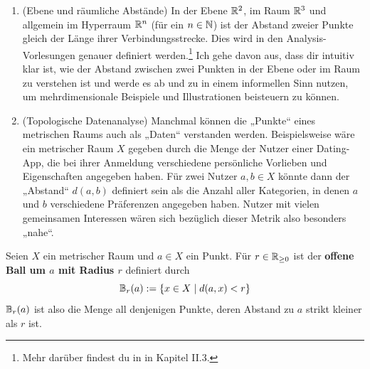 \begin{bsp} \quad
    \begin{enumerate}
        \item(Ebene und räumliche Abstände) In der Ebene $\mathbb R^2$, im Raum $\mathbb R^3$ und allgemein im Hyperraum $\mathbb R^n$ (für ein $n\in \mathbb N$) ist der Abstand zweier Punkte gleich der Länge ihrer Verbindungsstrecke. Dies wird in den Analysis-Vorlesungen genauer definiert werden.\footnote{Mehr darüber findest du in \cite{AE06} in Kapitel II.3.} Ich gehe davon aus, dass dir intuitiv klar ist, wie der Abstand zwischen zwei Punkten in der Ebene oder im Raum zu verstehen ist und werde es ab und zu in einem informellen Sinn nutzen, um mehrdimensionale Beispiele und Illustrationen beisteuern zu können.
        \item(Topologische Datenanalyse) Manchmal können die „Punkte“ eines metrischen Raums auch als „Daten“ verstanden werden. Beispielsweise wäre ein metrischer Raum $X$ gegeben durch die Menge der Nutzer einer Dating-App, die bei ihrer Anmeldung verschiedene persönliche Vorlieben und Eigenschaften angegeben haben. Für zwei Nutzer $a,b\in X$ könnte dann der „Abstand“ $d(a,b)$ definiert sein als die Anzahl aller Kategorien, in denen $a$ und $b$ verschiedene Präferenzen angegeben haben. Nutzer mit vielen gemeinsamen Interessen wären sich bezüglich dieser Metrik also besonders „nahe“.
    \end{enumerate}
\end{bsp}


\begin{de} \label{def:ball} 
    Seien $X$ ein metrischer Raum und $a\in X$ ein Punkt. Für $r\in \mathbb R_{\ge 0}$ ist der \textbf{offene Ball um $a$ mit Radius $r$} definiert durch
        \[ \mathbb B_r(a) := \{ x\in X \mid d(a,x)< r\} \]
    $\mathbb B_r(a)$ ist also die Menge all denjenigen Punkte, deren Abstand zu $a$ strikt kleiner als $r$ ist.
\end{de}


